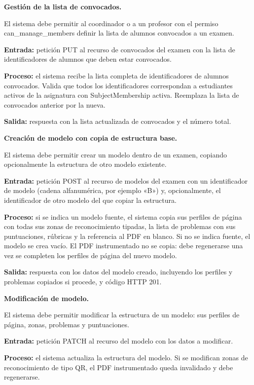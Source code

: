 \begin{functional}
\begin{functional}
    \item \textbf{Gestión de la lista de convocados.}

    El sistema debe permitir al coordinador o a un profesor con el permiso can\_manage\_members definir la lista de alumnos convocados a un examen.

    \textbf{Entrada:} petición PUT al recurso de convocados del examen con la lista de identificadores de alumnos que deben estar convocados.

    \textbf{Proceso:} el sistema recibe la lista completa de identificadores de alumnos convocados. Valida que todos los identificadores correspondan a estudiantes activos de la asignatura con SubjectMembership activa. Reemplaza la lista de convocados anterior por la nueva.

    \textbf{Salida:} respuesta con la lista actualizada de convocados y el número total.

    \item \textbf{Creación de modelo con copia de estructura base.}

    El sistema debe permitir crear un modelo dentro de un examen, copiando opcionalmente la estructura de otro modelo existente.

    \textbf{Entrada:} petición POST al recurso de modelos del examen con un identificador de modelo (cadena alfanumérica, por ejemplo «B») y, opcionalmente, el identificador de otro modelo del que copiar la estructura.

    \textbf{Proceso:} si se indica un modelo fuente, el sistema copia sus perfiles de página con todas sus zonas de reconocimiento tipadas, la lista de problemas con sus puntuaciones, rúbricas y la referencia al PDF en blanco. Si no se indica fuente, el modelo se crea vacío. El PDF instrumentado no se copia: debe regenerarse una vez se completen los perfiles de página del nuevo modelo.

    \textbf{Salida:} respuesta con los datos del modelo creado, incluyendo los perfiles y problemas copiados si procede, y código HTTP 201.

    \item \textbf{Modificación de modelo.}

    El sistema debe permitir modificar la estructura de un modelo: sus perfiles de página, zonas, problemas y puntuaciones.

    \textbf{Entrada:} petición PATCH al recurso del modelo con los datos a modificar.

    \textbf{Proceso:} el sistema actualiza la estructura del modelo. Si se modifican zonas de reconocimiento de tipo QR, el PDF instrumentado queda invalidado y debe regenerarse.


\end{functional}
\end{functional}
